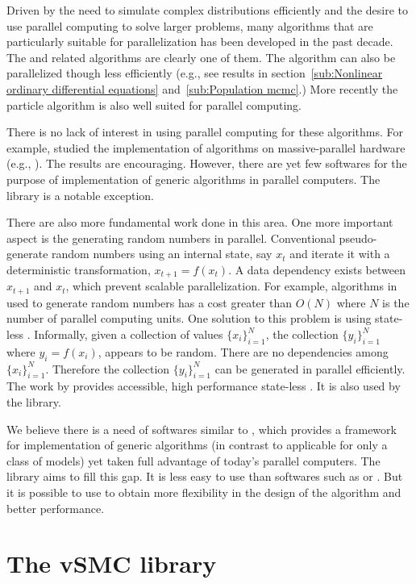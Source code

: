 Driven by the need to simulate complex distributions efficiently and the
desire to use parallel computing to solve larger problems, many algorithms
that are particularly suitable for parallelization has been developed in the
past decade. The \smc and related algorithms are clearly one of them. The
\pmcmc algorithm can also be parallelized though less efficiently (e.g., see
results in section~\ref{sub:Nonlinear ordinary differential equations}
and~\ref{sub:Population mcmc}.) More recently the particle \mcmc algorithm
\cite{Andrieu:2010gc} is also well suited for parallel computing.

There is no lack of interest in using parallel computing for these algorithms.
For example, \cite{Lee:2010fm} studied the implementation of \smc algorithms
on massive-parallel hardware (e.g., \gpu). The results are encouraging.
However, there are yet few softwares for the purpose of implementation of
generic \smc algorithms in parallel computers. The \libbi library is a notable
exception.

There are also more fundamental work done in this area. One more important
aspect is the generating random numbers in parallel. Conventional pseudo-\rng
generate random numbers using an internal state, say $x_t$ and iterate it with
a deterministic transformation, $x_{t+1} = f(x_t)$. A data dependency exists
between $x_{t+1}$ and $x_t$, which prevent scalable parallelization. For
example, algorithms in \cite{Lee:2010fm} used to generate random numbers has a
cost greater than $O(N)$ where $N$ is the number of parallel computing units.
One solution to this problem is using state-less \rng. Informally, given a
collection of values $\{x_i\}_{i=1}^N$, the collection $\{y_i\}_{i=1}^N$ where
$y_i = f(x_i)$, appears to be random. There are no dependencies among
$\{x_i\}_{i=1}^N$. Therefore the collection $\{y_i\}_{i=1}^N$ can be generated
in parallel efficiently. The work by \cite{Salmon:2011um} provides accessible,
high performance state-less \rng. It is also used by the \vsmc library.

We believe there is a need of softwares similar to \smctc, which provides a
framework for implementation of generic \smc algorithms (in contrast to
applicable for only a class of models) yet taken full advantage of today's
parallel computers. The \vsmc library aims to fill this gap. It is less easy
to use than softwares such as \libbi or \biips. But it is possible to use to
obtain more flexibility in the design of the algorithm and better performance.

\section{The vSMC library}
\label{sec:The vSMC library}

